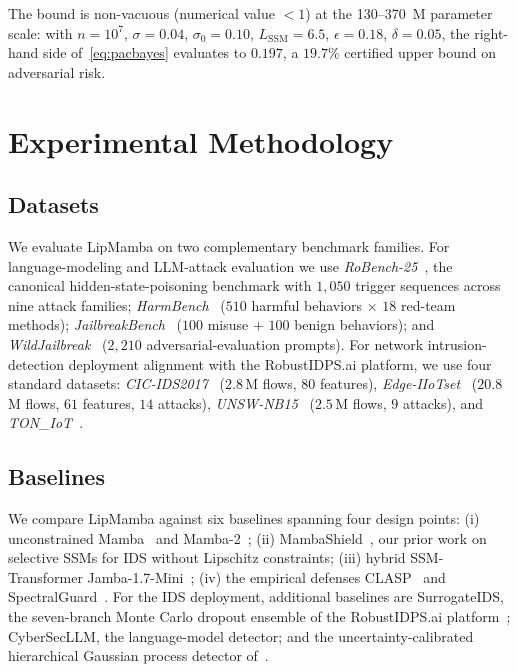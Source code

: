 \documentclass[journal,a4paper,10pt]{IEEEtran}
\theoremstyle{definition}
\theoremstyle{remark}
\newcommand{\modelname}{LipMamba}
\begin{document}
The bound is non-vacuous (numerical value $< 1$) at the 130--370~M parameter scale: with $n = 10^7$, $\sigma = 0.04$, $\sigma_0 = 0.10$, $L_{\mathrm{SSM}} = 6.5$, $\epsilon = 0.18$, $\delta = 0.05$, the right-hand side of~\eqref{eq:pacbayes} evaluates to $0.197$, a $19.7\%$ certified upper bound on adversarial risk.


\section{Experimental Methodology}
\label{sec:experiments}

\subsection{Datasets}

We evaluate \modelname{} on two complementary benchmark families. For language-modeling and LLM-attack evaluation we use \emph{RoBench-25}~\cite{lemercier2026hispa}, the canonical hidden-state-poisoning benchmark with $1{,}050$ trigger sequences across nine attack families; \emph{HarmBench}~\cite{mazeika2024harmbench} ($510$ harmful behaviors $\times$ $18$ red-team methods); \emph{JailbreakBench}~\cite{chao2024jailbreakbench} ($100$ misuse $+$ $100$ benign behaviors); and \emph{WildJailbreak}~\cite{jiang2024wildjailbreak} ($2{,}210$ adversarial-evaluation prompts). For network intrusion-detection deployment alignment with the RobustIDPS.ai platform, we use four standard datasets: \emph{CIC-IDS2017}~\cite{sharafaldin2018toward} ($2.8\,$M flows, $80$ features), \emph{Edge-IIoTset}~\cite{ferrag2022edge} ($20.8\,$M flows, $61$ features, $14$ attacks), \emph{UNSW-NB15}~\cite{moustafa2015unsw} ($2.5\,$M flows, $9$ attacks), and \emph{TON\_IoT}~\cite{alsaedi2020ton}.

\subsection{Baselines}

We compare \modelname{} against six baselines spanning four design points: (i) unconstrained Mamba~\cite{gu2024mamba} and Mamba-2~\cite{dao2024mamba2}; (ii) MambaShield~\cite{anaedevha2025mambashield}, our prior work on selective SSMs for IDS without Lipschitz constraints; (iii) hybrid SSM-Transformer Jamba-1.7-Mini~\cite{lieber2024jamba}; (iv) the empirical defenses CLASP~\cite{lemercier2026clasp} and SpectralGuard~\cite{lemercier2026spectralguard}. For the IDS deployment, additional baselines are SurrogateIDS, the seven-branch Monte Carlo dropout ensemble of the RobustIDPS.ai platform~\cite{anaedevha2026robustidps}; CyberSecLLM, the language-model detector; and the uncertainty-calibrated hierarchical Gaussian process detector of~\cite{anaedevha2026uchgp}.
\end{document}
